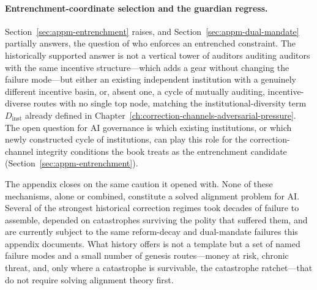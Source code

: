 \begin{refsection}
\paragraph{Entrenchment-coordinate selection and the guardian regress.} Section~\ref{sec:appm-entrenchment} raises, and Section~\ref{sec:appm-dual-mandate} partially answers, the question of who enforces an entrenched constraint. The historically supported answer is not a vertical tower of auditors auditing auditors with the same incentive structure---which adds a gear without changing the failure mode---but either an existing independent institution with a genuinely different incentive basin, or, absent one, a cycle of mutually auditing, incentive-diverse routes with no single top node, matching the institutional-diversity term \(D_{\mathrm{inst}}\) already defined in Chapter~\ref{ch:correction-channels-adversarial-pressure}. The open question for AI governance is which existing institutions, or which newly constructed cycle of institutions, can play this role for the correction-channel integrity conditions the book treats as the entrenchment candidate (Section~\ref{sec:appm-entrenchment}).

The appendix closes on the same caution it opened with. None of these mechanisms, alone or combined, constitute a solved alignment problem for AI. Several of the strongest historical correction regimes took decades of failure to assemble, depended on catastrophes surviving the polity that suffered them, and are currently subject to the same reform-decay and dual-mandate failures this appendix documents. What history offers is not a template but a set of named failure modes and a small number of genesis routes---money at risk, chronic threat, and, only where a catastrophe is survivable, the catastrophe ratchet---that do not require solving alignment theory first.

\authbarneedspace

\end{refsection}
